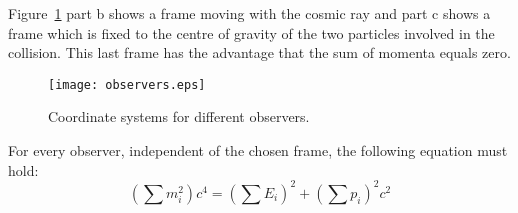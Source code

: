 Figure~\ref{fig:observers} part b shows a frame moving with the cosmic ray and part c shows a frame which is fixed to the centre of gravity of the two particles involved in the collision. This last frame has the advantage that the sum of momenta equals zero.

\begin{figure}\begin{center}
\texttt{[image: observers.eps]}%
\caption{Coordinate systems for different observers.}\label{fig:observers}
\end{center}\end{figure}

For every observer, independent of the chosen frame, the following equation must hold:
\begin{equation}
\left(  \sum m_i^2 \right)  c^4 = \left(  \sum E_i \right)^2 + \left(  \sum p_i \right)^2 c^2 \label{eq:frame_indep}
\end{equation}

